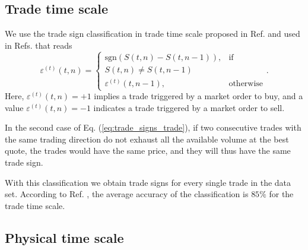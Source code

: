 \subsection{Trade time scale}\label{subsec:trade_time}

We use the trade sign classification in trade time scale proposed in Ref.
\cite{Wang_2016_cross} and used in Refs.
\cite{my_paper_response_financial,Wang_2017,Wang_2018_copulas,Wang_2016_avg}
that reads
\begin{equation}\label{eq:trade_signs_trade}
    \varepsilon^{\left(t\right)}\left(t,n\right)=\left\{
    \begin{array}{cc}
    \text{sgn}\left(S\left(t,n\right)-S\left(t,n-1\right)\right),
    & \text{if }\\ S\left(t,n\right) \ne S\left(t,n-1\right)\\
    \varepsilon^{\left(t\right)}\left(t,n-1\right),
    & \text{otherwise}
    \end{array}\right..
\end{equation}
Here, $\varepsilon^{\left(t\right)}\left( t,n \right) = +1$ implies a trade
triggered by a market order to buy, and a value
$\varepsilon^{\left(t\right)}\left( t,n \right) = -1$ indicates a trade
triggered by a market order to sell.

In the second case of Eq. (\ref{eq:trade_signs_trade}), if two consecutive
trades with the same trading direction do not exhaust all the available volume
at the best quote, the trades would have the same price, and they will thus
have the same trade sign.

With this classification we obtain trade signs for every single trade in the
data set. According to Ref. \cite{Wang_2016_cross}, the average accuracy of the
classification is $85\%$ for the trade time scale.

\subsection{Physical time scale}\label{subsec:physical_time}

